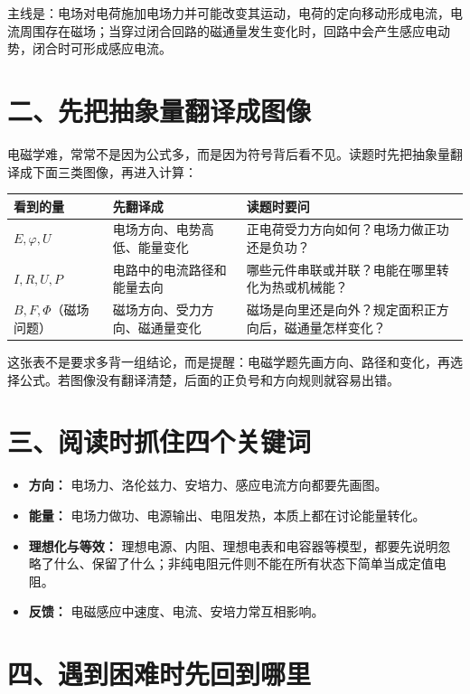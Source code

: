 主线是：电场对电荷施加电场力并可能改变其运动，电荷的定向移动形成电流，电流周围存在磁场；当穿过闭合回路的磁通量发生变化时，回路中会产生感应电动势，闭合时可形成感应电流。

\section*{二、先把抽象量翻译成图像}

电磁学难，常常不是因为公式多，而是因为符号背后看不见。读题时先把抽象量翻译成下面三类图像，再进入计算：

\begin{center}
\begin{tabular}{p{}p{}p{}}
\toprule
\textbf{看到的量} & \textbf{先翻译成} & \textbf{读题时要问} \\
\midrule
$E,\varphi,U$ & 电场方向、电势高低、能量变化 & 正电荷受力方向如何？电场力做正功还是负功？ \\
$I,R,U,P$ & 电路中的电流路径和能量去向 & 哪些元件串联或并联？电能在哪里转化为热或机械能？ \\
$B,F,\Phi$（磁场问题） & 磁场方向、受力方向、磁通量变化 & 磁场是向里还是向外？规定面积正方向后，磁通量怎样变化？ \\
\bottomrule
\end{tabular}
\end{center}

这张表不是要求多背一组结论，而是提醒：电磁学题先画方向、路径和变化，再选择公式。若图像没有翻译清楚，后面的正负号和方向规则就容易出错。

\section*{三、阅读时抓住四个关键词}

\begin{itemize}[itemsep=0.2em]
  \item \textbf{方向：} 电场力、洛伦兹力、安培力、感应电流方向都要先画图。
  \item \textbf{能量：} 电场力做功、电源输出、电阻发热，本质上都在讨论能量转化。
  \item \textbf{理想化与等效：} 理想电源、内阻、理想电表和电容器等模型，都要先说明忽略了什么、保留了什么；非纯电阻元件则不能在所有状态下简单当成定值电阻。
  \item \textbf{反馈：} 电磁感应中速度、电流、安培力常互相影响。
\end{itemize}

\section*{四、遇到困难时先回到哪里}

